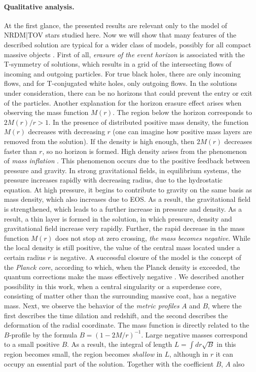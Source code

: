 \documentclass{article}
\begin{document}
\paragraph* {Qualitative analysis.} At the first glance, the presented results are relevant only to the model of NRDM|TOV stars studied here. Now we will show that many features of the described solution are typical for a wider class of models, possibly for all compact massive objects \cite {0902.0346,1612.04889,1401.6562,1409.1501}. First of all, {\it erasure of the event horizon} is associated with the T-symmetry of solutions, which results in a grid of the intersecting flows of incoming and outgoing particles. For true black holes, there are only incoming flows, and for T-conjugated white holes, only outgoing flows. In the solutions under consideration, there can be no horizons that could prevent the entry or exit of the particles. Another explanation for the horizon erasure effect arises when observing the mass function $ M (r) $. The region below the horizon corresponds to $ 2M (r) / r> 1 $. In the presence of distributed positive mass density, the function $ M (r) $ decreases with decreasing $ r $ (one can imagine how positive mass layers are removed from the solution). If the density is high enough, then $ 2M (r) $ decreases faster than $ r $, so no horizon is formed. High density arises from the phenomenon of {\it mass inflation} \cite {gr-qc/0411062}. This phenomenon occurs due to the positive feedback between pressure and gravity. In strong gravitational fields, in equilibrium systems, the pressure increases rapidly with decreasing radius, due to the hydrostatic equation. At high pressure, it begins to contribute to gravity on the same basis as mass density, which also increases due to EOS. As a result, the gravitational field is strengthened, which leads to a further increase in pressure and density. As a result, a thin layer is formed in the solution, in which pressure, density and gravitational field increase very rapidly. Further, the rapid decrease in the mass function $ M (r) $ does not stop at zero crossing, {\it the mass becomes negative}. While the local density is still positive, the value of the central mass located under a certain radius $ r $ is negative. A successful closure of the model is the concept of the {\it Planck core}, according to which, when the Planck density is exceeded, the quantum corrections make the mass effectively negative \cite {1401.6562,1409.1501}. We described another possibility in this work, when a central singularity or a superdense core, consisting of matter other than the surrounding massive coat, has a negative mass. Next, we observe the behavior of the {\it metric profiles} $ A $ and $ B $, where the first describes the time dilation and redshift, and the second describes the deformation of the radial coordinate. The mass function is directly related to the $ B $-profile by the formula $ B = (1-2M / r) ^ {- 1} $. Large negative masses correspond to a small positive $ B $. As a result, the integral of length $ L = \int dr \sqrt {B} $ in this region becomes small, the region becomes {\it shallow} in $ L $, although in $ r $ it can occupy an essential part of the solution. Together with the coefficient $ B $, $ A $ also 
\end{document}

